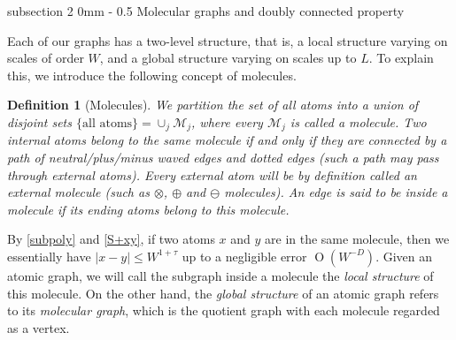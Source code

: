 \documentclass{article}
\makeatletter
\newcommand{\1}{\mathds{1}}
\numberwithin{equation}{section}
\renewcommand{\cal}{\mathcal}
\renewcommand{\leq}{\leqslant}
\renewcommand{\le}{\leq}
\DeclareMathOperator{\OO}{O}
\theoremstyle{plain} %
\newtheorem{definition}[theorem]{Definition}
\theoremstyle{remark}
\newtheorem{remark}[theorem]{Remark}
\renewcommand{\subsection}{\@startsection
	{subsection}%
	{2}%
	{0mm}%
	{-\baselineskip}%
	{0.5\baselineskip}%
	{\normalfont\bf\itshape}} %
\makeatother
\begin{document}
\subsection{Molecular graphs and doubly connected property}\label{sec doublenet}
 
Each of our graphs has a two-level structure, that is, a local structure varying on scales of order $W$, and a global structure varying on scales up to $L$. To explain this, we introduce the following concept of molecules. 


\begin{definition}[Molecules]\label{def_poly}
We partition the set of all atoms into a union of disjoint sets $\{\text{all atoms}\}=\cup_j \cal M_j$, where every $\cal M_j$ is called a molecule. Two internal atoms belong to the same molecule if and only if they are connected by a path of neutral/plus/minus \emph{waved edges} and \emph{dotted edges} (such a path may pass through external atoms). %
	Every external atom will be by definition called an external molecule (such as $\otimes$, $\oplus$ and $\ominus$ molecules).  %
	An edge is said to be inside a molecule if its ending atoms belong to this molecule.
\end{definition}
By \eqref{subpoly} and \eqref{S+xy}, if two atoms $x$ and $y$ are in the same molecule, then we essentially have $|x-y|\le W^{1+\tau}$ up to a negligible error $\OO(W^{-D})$. Given an atomic graph, we will call the subgraph inside a molecule the {\it local structure} of this molecule. On the other hand, the {\it global structure} of an atomic graph refers to its \emph{molecular graph}, which is the quotient graph with each molecule regarded as a vertex. 
\end{document}
